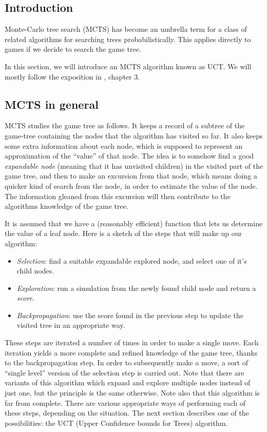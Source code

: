 \subsection {Introduction}

Monte-Carlo tree search (MCTS) has become an umbrella term for a class of related algorithms for searching trees probabilistically.
This applies directly to games if we decide to search the game tree.

In this section, we will introduce an MCTS algorithm known as UCT.
We will mostly follow the exposition in \citep{mcts_survey12}, chapter 3.

\subsection {MCTS in general}

MCTS studies the game tree as follows.
It keeps a record of a subtree of the game-tree containing the nodes that the algorithm has visited so far.
It also keeps some extra information about each node, which is supposed to represent an approximation of the ``value'' of that node.
The idea is to somehow find a good \emph{expandable node} (meaning that it has unvisited children) in the visited part of the game tree, and then to make an excursion from that node, which means doing a quicker kind of search from the node, in order to estimate the value of the node. The information gleaned from this excursion will then contribute to the algorithms knowledge of the game tree.

It is assumed that we have a (reasonably efficient) function that lets us determine the value of a leaf node.
Here is a sketch of the steps that will make up our algorithm:

\begin{itemize}
\item \emph{Selection}: find a suitable expandable explored node, and select one of it's child nodes.
\item \emph{Exploration}: run a simulation from the newly found child node and return a \emph{score}.
\item \emph{Backpropagation}: use the score found in the previous step to update the visited tree in an appropriate way.
\end{itemize}
These steps are iterated a number of times in order to make a single move. Each iteration yields a more complete and refined knowledge of the game tree, thanks to the backpropagation step. In order to subsequently make a move, a sort of ``single level'' version of the selection step is carried out.
Note that there are variants of this algorithm which expand and explore multiple nodes instead of just one, but the principle is the same otherwise.
Note also that this algorithm is far from complete. There are various appropriate ways of performing each of these steps, depending on the situation.
The next section describes one of the possibilities: the UCT (Upper Confidence bounds for Trees) algorithm.

